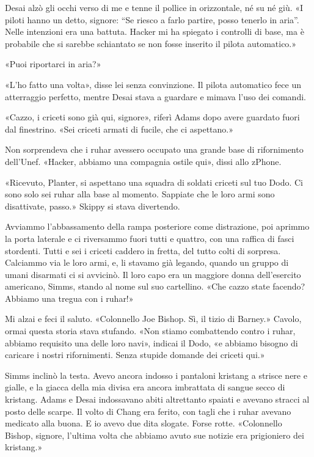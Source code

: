 Desai alzò gli occhi verso di me e tenne il pollice in orizzontale, né
su né giù. «I piloti hanno un detto, signore: ``Se riesco a farlo
partire, posso tenerlo in aria''. Nelle intenzioni era una battuta.
Hacker mi ha spiegato i controlli di base, ma è probabile che si sarebbe
schiantato se non fosse inserito il pilota automatico.»

«Puoi riportarci in aria?»

«L'ho fatto una volta», disse lei senza convinzione. Il pilota
automatico fece un atterraggio perfetto, mentre Desai stava a guardare e
mimava l'uso dei comandi.

«Cazzo, i criceti sono già qui, signore», riferì Adams dopo avere
guardato fuori dal finestrino. «Sei criceti armati di fucile, che ci
aspettano.»

Non sorprendeva che i ruhar avessero occupato una grande base di
rifornimento dell'Unef. «Hacker, abbiamo una compagnia ostile qui»,
dissi allo zPhone.

«Ricevuto, Planter, si aspettano una squadra di soldati criceti sul tuo
Dodo. Ci sono solo sei ruhar alla base al momento. Sappiate che le loro
armi sono disattivate, passo.» Skippy si stava divertendo.

Avviammo l'abbassamento della rampa posteriore come distrazione, poi
aprimmo la porta laterale e ci riversammo fuori tutti e quattro, con una
raffica di fasci stordenti. Tutti e sei i criceti caddero in fretta, del
tutto colti di sorpresa. Calciammo via le loro armi, e, li stavamo già
legando, quando un gruppo di umani disarmati ci si avvicinò. Il loro
capo era un maggiore donna dell'esercito americano, Simms, stando al
nome sul suo cartellino. «Che cazzo state facendo? Abbiamo una tregua
con i ruhar!»

Mi alzai e feci il saluto. «Colonnello Joe Bishop. Sì, il tizio di
Barney.» Cavolo, ormai questa storia stava stufando. «Non stiamo
combattendo contro i ruhar, abbiamo requisito una delle loro navi»,
indicai il Dodo, «e abbiamo bisogno di caricare i nostri rifornimenti.
Senza stupide domande dei criceti qui.»

Simms inclinò la testa. Avevo ancora indosso i pantaloni kristang a
strisce nere e gialle, e la giacca della mia divisa era ancora
imbrattata di sangue secco di kristang. Adams e Desai indossavano abiti
altrettanto spaiati e avevano stracci al posto delle scarpe. Il volto di
Chang era ferito, con tagli che i ruhar avevano medicato alla buona. E
io avevo due dita slogate. Forse rotte. «Colonnello Bishop, signore,
l'ultima volta che abbiamo avuto sue notizie era prigioniero dei
kristang.»

